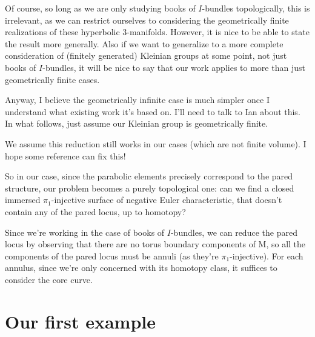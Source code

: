 \documentclass[12pt]{amsart}
\newtheorem{thm}[theorem]{Theorem}
\theoremstyle{definition}
\theoremstyle{remark}
\begin{document}
{Of course, so long as we are only studying books of $I$-bundles topologically,
this is irrelevant, as we can restrict ourselves to considering the
geometrically finite realizations of these hyperbolic 3-manifolds. However, it
is nice to be able to state the result more generally. Also if we want to
generalize to a more complete consideration of (finitely generated) Kleinian
groups at some point, not just books of $I$-bundles, it will be nice to say that
our work applies to more than just geometrically finite cases.

Anyway, I believe the geometrically infinite case is much simpler once
I understand what existing work it's based on. I'll need to talk to Ian about
this. In what follows, just assume our Kleinian group is geometrically finite.

%
%
%

We assume this reduction still works in our cases (which are not finite
volume). I hope some reference can fix this!

So in our case, since the parabolic elements precisely correspond to the pared
structure, our problem becomes a purely topological one: can we find a closed
immersed $\pi_1$-injective surface of negative Euler characteristic, that
doesn't contain any of the pared locus, up to homotopy?

Since we're working in the case of books of $I$-bundles, we can reduce the
pared locus by observing that there are no torus boundary components of M, so
all the components of the pared locus must be annuli (as they're
$\pi_1$-injective). For each annulus, since we're only concerned with its
homotopy class, it suffices to consider the core curve.

}

\section{Our first example}
\end{document}
